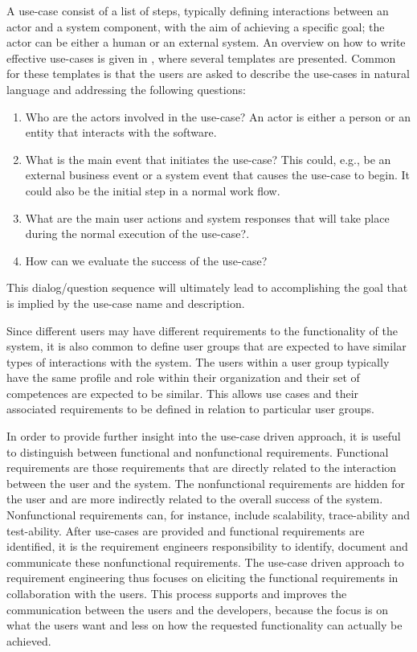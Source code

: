 A use-case consist of a list of steps, typically defining interactions between an actor and a system component, with the aim of
achieving a specific  goal; the actor can be either a human or an external system.  An overview on how to write
effective use-cases is given in \cite{Coc01}, where several templates are presented. Common for these templates is that
the users are asked to describe the use-cases in natural language and addressing the following questions:
\begin{enumerate}
\item Who are the actors involved in the use-case? An actor is either a person or an entity that interacts with the software.  
\item What is the main event that initiates the use-case? This could, e.g., be an external business event or a system event that causes the use-case to begin.  It could also be the initial step in a normal work flow. 
\item What are the main user actions and system responses that will take place during the normal execution of the use-case?. 
\item How can we evaluate the success of the use-case?
\end{enumerate}
This dialog/question sequence will ultimately lead to accomplishing the goal that is implied by the use-case name and description.

Since different users may have different requirements to the functionality of the system, it is also common to define
user groups that are expected to have similar types of interactions with the system. The users
within a user group typically have the same profile and role within their organization and their set of competences are expected to
be similar. This allows use cases and their associated requirements to be defined in relation to particular user groups.

In order to provide further insight into the use-case driven approach, it is useful to distinguish between functional and nonfunctional
requirements.  Functional requirements are those requirements that are directly related to the interaction between the
user and the system.  The nonfunctional requirements are hidden for the user and are more indirectly related to the  overall
success of the system.  Nonfunctional requirements can, for instance, include scalability, trace-ability and test-ability.  After use-cases are provided and functional
requirements are identified, it is the requirement engineers responsibility to identify, document and communicate these
nonfunctional requirements.  The use-case driven approach to requirement engineering thus focuses on eliciting the
functional requirements in collaboration with the users.  This process supports and improves the communication between the users and the developers,
because the focus is on what the users want and less on how the requested functionality can actually be achieved.
